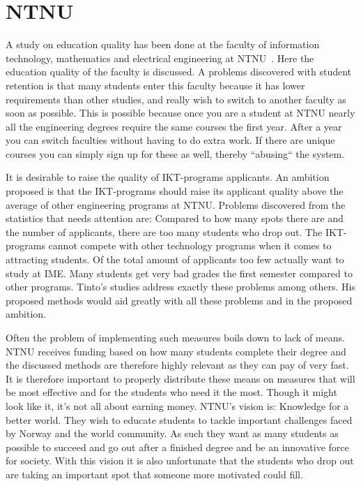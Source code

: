 \section{NTNU}
A study on education quality has been done at the faculty of information technology, mathematics and electrical engineering at NTNU~\cite{ntnu:dropout}. 
Here the education quality of the faculty is discussed. 
A problems discovered with student retention is that many students enter this faculty because it has lower requirements than other studies, and really wish to switch to another faculty as soon as possible. 
This is possible because once you are a student at NTNU nearly all the engineering degrees require the same courses the first year. 
After a year you can switch faculties without having to do extra work. 
If there are unique courses you can simply sign up for these as well, thereby ``abusing`` the system.

\bigskip\noindent
It is desirable to raise the quality of IKT-programs applicants. 
An ambition proposed is that the IKT-programs should raise its applicant quality above the average of other engineering programs at NTNU.
Problems discovered from the statistics that needs attention are:
Compared to how many spots there are and the number of applicants, there are too many students who drop out. 
The IKT-programs cannot compete with other technology programs when it comes to attracting students. 
Of the total amount of applicants too few actually want to study at IME.
Many students get very bad grades the first semester compared to other programs.
Tinto's studies address exactly these problems among others. His proposed methods would aid greatly with all these problems and in the proposed ambition.

\bigskip\noindent
Often the problem of implementing such measures boils down to lack of means.
NTNU receives funding based on how many students complete their degree and the discussed methods are therefore highly relevant as they can pay of very fast.
It is therefore important to properly distribute these means on measures that will be most effective and for the students who need it the most.
Though it might look like it, it's not all about earning money.
NTNU's vision is: Knowledge for a better world.
They wish to educate students to tackle important challenges faced by Norway and the world community.
As such they want as many students as possible to succeed and go out after a finished degree and be an innovative force for society. 
With this vision it is also unfortunate that the students who drop out are taking an important spot that someone more motivated could fill.

